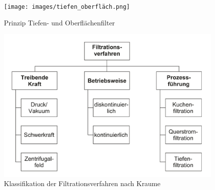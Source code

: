 \begin{figure}[H]
    \begin{center}
        \texttt{[image: images/tiefen\_oberfläch.png]}
        \caption[Tiefen- und Oberflächenfiltration]{Prinzip Tiefen- und Oberflächenfilter \cite{immission} }
        \label{fi:tiefen_oberfläch}
    \end{center}
\end{figure}
\begin{figure}[H]
    \begin{center}
        \includegraphics[width=0.8\linewidth]{images/klassifikation_filtrationsverfahren.png}
        \caption[Klassifikation Filtrationsprozesse]{Klassifikation der Filtrationsverfahren nach Kraume \cite{transportvorgänge} }
        \label{fi:klassifikation_filtration}
    \end{center}
\end{figure}
